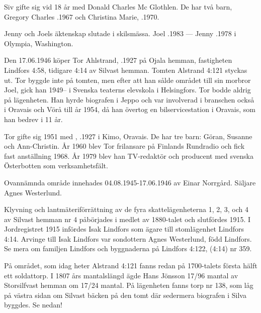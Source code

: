 Siv gifte sig vid 18 år med Donald Charles Mc Glothlen. De har två barn, Gregory Charles .1967 och Christina Marie, .1970.

Jenny och Joels äktenskap slutade i skilsmässa.	Joel .1983  ---  Jenny .1978 i Olympia, Washington.


%
Den 17.06.1946 köper Tor Ahlstrand, .1927 på Ojala hemman, fastigheten Lindfors 4:58, tidigare 4:14 av Silvast hemman. Tomten Alstrand 4:121 styckas ut. Tor byggde inte på tomten, men efter att han sålde området till sin morbror Joel, gick han 1949-- i Svenska teaterns elevskola i Helsingfors. Tor bodde aldrig på lägenheten. Han hyrde biografen i Jeppo och var involverad i branschen också i Oravais och Vörå till år 1954, då han övertog en bilservicestation i Oravais, som han bedrev i 11 år.

Tor gifte sig 1951 med , .1927 i Kimo, Oravais. De har tre barn: Göran, Susanne och Ann-Christin.	År 1960 blev Tor frilansare på Finlands Rundradio och fick fast anställning 1968. År 1979 blev han TV-redaktör och producent med svenska Österbotten som verksamhetsfält.


%
Ovannämnda område innehades 04.08.1945-17.06.1946	av Einar Norrgård. Säljare Agnes Westerlund.\jhvspace{}


%
Klyvning och lantmäteriförrättning av de fyra skattelägenheterna 1, 2, 3, och 4 av Silvast hemman nr 4 påbörjades i medlet av 1880-talet och slutfördes 1915. I Jordregistret 1915 infördes Isak Lindfors som ägare till stomlägenhet Lindfors 4:14. Arvinge till Isak Lindfors var	sondottern Agnes Westerlund, född Lindfors. Se mera om familjen Lindfors och byggnaderna på Lindfors 4:122, (4:14) nr 359.


%
På området, som idag heter Alstrand 4:121 fanns redan på 1700-talets första hälft ett soldattorp. I 1807 års mantalslängd	ägde Hans Jönsson 17/96 mantal av Storsilfvast hemman om 17/24 mantal. På lägenheten fanns torp nr 138, som	låg på västra sidan om Silvast bäcken på den tomt där sedermera biografen i Silva byggdes. Se nedan!



